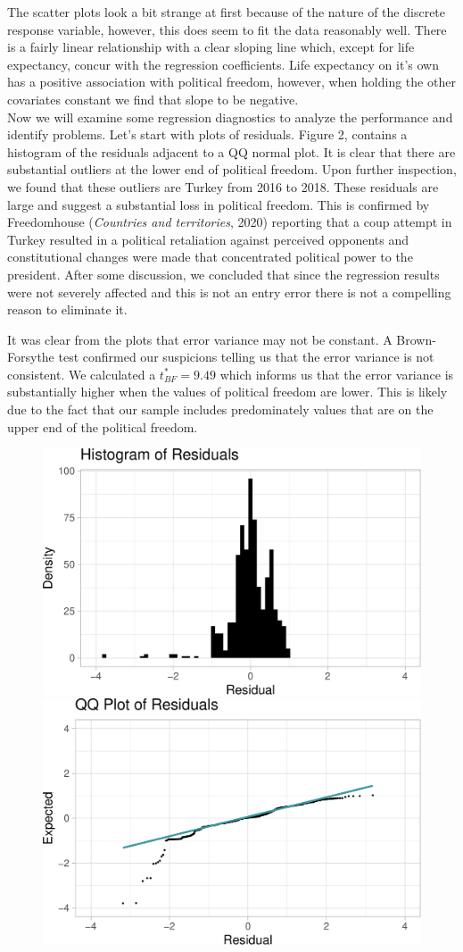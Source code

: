 \documentclass[
  english,
  man,floatsintext]{apa6}
\begin{document}
The scatter plots look a bit strange at first because of the nature of the discrete response variable, however, this does seem to fit the data reasonably well. There is a fairly linear relationship with a clear sloping line which, except for life expectancy, concur with the regression coefficients. Life expectancy on it's own has a positive association with political freedom, however, when holding the other covariates constant we find that slope to be negative.\\
Now we will examine some regression diagnostics to analyze the performance and identify problems. Let's start with plots of residuals. Figure 2, contains a histogram of the residuals adjacent to a QQ normal plot. It is clear that there are substantial outliers at the lower end of political freedom. Upon further inspection, we found that these outliers are Turkey from 2016 to 2018. These residuals are large and suggest a substantial loss in political freedom. This is confirmed by Freedomhouse (\emph{Countries and territories}, 2020) reporting that a coup attempt in Turkey resulted in a political retaliation against perceived opponents and constitutional changes were made that concentrated political power to the president. After some discussion, we concluded that since the regression results were not severely affected and this is not an entry error there is not a compelling reason to eliminate it.

It was clear from the plots that error variance may not be constant. A Brown-Forsythe test confirmed our suspicions telling us that the error variance is not consistent. We calculated a \(t^{*}_{BF} = 9.49\) which informs us that the error variance is substantially higher when the values of political freedom are lower. This is likely due to the fact that our sample includes predominately values that are on the upper end of the political freedom.

\begin{figure}
\includegraphics[width=0.5\linewidth]{paper_files/figure-latex/unnamed-chunk-6-1} \includegraphics[width=0.5\linewidth]{paper_files/figure-latex/unnamed-chunk-6-2} \caption{ }\label{fig:unnamed-chunk-6}
\end{figure}
\end{document}
